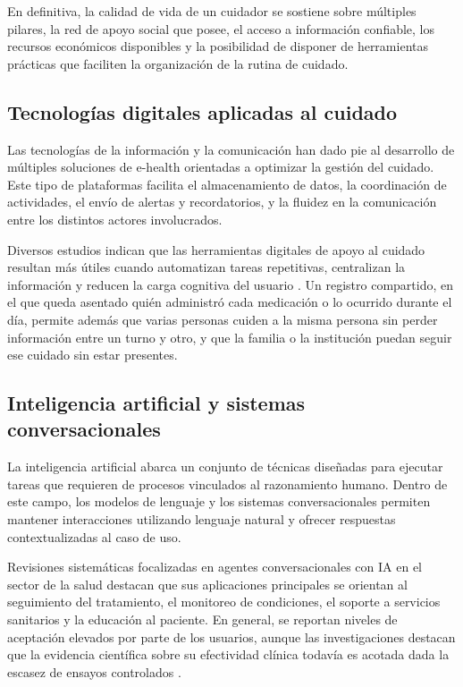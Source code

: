 En definitiva, la calidad de vida de un cuidador se sostiene sobre múltiples pilares, la red de apoyo social que posee, el acceso a información confiable, los recursos económicos disponibles y la posibilidad de disponer de herramientas prácticas que faciliten la organización de la rutina de cuidado.

\subsection{Tecnologías digitales aplicadas al cuidado}

Las tecnologías de la información y la comunicación han dado pie al desarrollo de múltiples soluciones de e-health orientadas a optimizar la gestión del cuidado. Este tipo de plataformas facilita el almacenamiento de datos, la coordinación de actividades, el envío de alertas y recordatorios, y la fluidez en la comunicación entre los distintos actores involucrados.

Diversos estudios indican que las herramientas digitales de apoyo al cuidado resultan más útiles cuando automatizan tareas repetitivas, centralizan la información y reducen la carga cognitiva del usuario \citep{schwedler2025}. Un registro compartido, en el que queda asentado quién administró cada medicación o lo ocurrido durante el día, permite además que varias personas cuiden a la misma persona sin perder información entre un turno y otro, y que la familia o la institución puedan seguir ese cuidado sin estar presentes.

\subsection{Inteligencia artificial y sistemas conversacionales}

La inteligencia artificial abarca un conjunto de técnicas diseñadas para ejecutar tareas que requieren de procesos vinculados al razonamiento humano. Dentro de este campo, los modelos de lenguaje y los sistemas conversacionales permiten mantener interacciones utilizando lenguaje natural y ofrecer respuestas contextualizadas al caso de uso.

Revisiones sistemáticas focalizadas en agentes conversacionales con IA en el sector de la salud destacan que sus aplicaciones principales se orientan al seguimiento del tratamiento, el monitoreo de condiciones, el soporte a servicios sanitarios y la educación al paciente. En general, se reportan niveles de aceptación elevados por parte de los usuarios, aunque las investigaciones destacan que la evidencia científica sobre su efectividad clínica todavía es acotada dada la escasez de ensayos controlados \citep{milneives2020,binsawad2022}.

